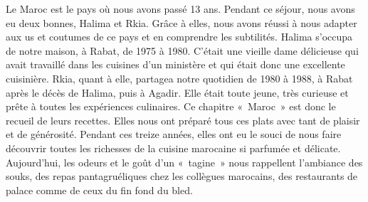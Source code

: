 Le Maroc est le pays où nous avons passé 13 ans. Pendant ce séjour, nous avons eu deux bonnes, Halima et Rkia. Grâce à elles, nous avons réussi à nous adapter aux us et coutumes de ce pays et en comprendre les subtilités. Halima s’occupa de notre maison, à Rabat, de 1975 à 1980. C’était une vieille dame délicieuse qui avait travaillé dans les cuisines d’un ministère et qui était donc une excellente cuisinière. Rkia, quant à elle, partagea notre quotidien de 1980 à 1988, à Rabat après le décès de Halima, puis à Agadir. Elle était toute jeune, très curieuse et prête à toutes les expériences culinaires.
Ce chapitre « Maroc » est donc le recueil de leurs recettes. Elles nous ont préparé tous ces plats avec tant de plaisir et de générosité. Pendant ces treize années, elles ont eu le souci de nous faire découvrir toutes les richesses de la cuisine marocaine si parfumée et délicate. Aujourd’hui, les odeurs et le goût d’un « tagine » nous rappellent l’ambiance des souks, des repas pantagruéliques chez les collègues marocains, des restaurants de palace comme de ceux du fin fond du bled.
